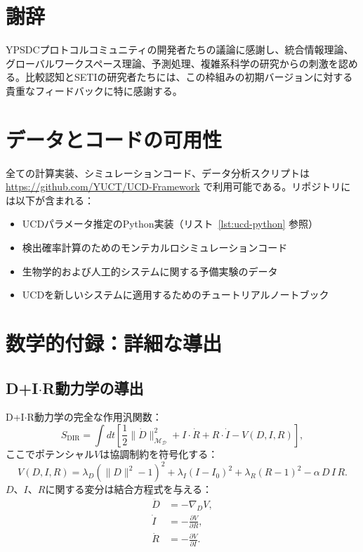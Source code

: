 \documentclass[11pt,a4paper]{article}
\newcommand{\Dict}{\mathcal{D}}
\newcommand{\Mdict}{\mathcal{M}_{\Dict}}
\begin{document}
	\section*{謝辞}
	
	YPSDCプロトコルコミュニティの開発者たちの議論に感謝し、統合情報理論、グローバルワークスペース理論、予測処理、複雑系科学の研究からの刺激を認める。比較認知とSETIの研究者たちには、この枠組みの初期バージョンに対する貴重なフィードバックに特に感謝する。
	
	\section*{データとコードの可用性}
	
	全ての計算実装、シミュレーションコード、データ分析スクリプトは \url{https://github.com/YUCT/UCD-Framework} で利用可能である。リポジトリには以下が含まれる：
	\begin{itemize}
		\item UCDパラメータ推定のPython実装（リスト~\ref{lst:ucd-python} 参照）
		\item 検出確率計算のためのモンテカルロシミュレーションコード
		\item 生物学的および人工的システムに関する予備実験のデータ
		\item UCDを新しいシステムに適用するためのチュートリアルノートブック
	\end{itemize}
	
	\appendix
	
	\section{数学的付録：詳細な導出}
	
	\subsection{D+I\(\cdot\)R動力学の導出}
	
	D+I\(\cdot\)R動力学の完全な作用汎関数：
	\[
	S_{\mathrm{DIR}} = \int dt \left[ \frac{1}{2}\|\dot{D}\|^2_{\Mdict} + I \cdot \dot{R} + R \cdot \dot{I} - V(D,I,R) \right],
	\]
	ここでポテンシャル\(V\)は協調制約を符号化する：
	\[
	V(D,I,R) = \lambda_D (\|D\|^2 - 1)^2 + \lambda_I (I - I_0)^2 + \lambda_R (R - 1)^2 - \alpha\, D\,I\,R.
	\]
	\(D\)、\(I\)、\(R\)に関する変分は結合方程式を与える：
	\begin{align*}
		\ddot{D} &= -\nabla_D V, \\
		\dot{I}  &= -\frac{\partial V}{\partial R}, \\
		\dot{R}  &= -\frac{\partial V}{\partial I}.
	\end{align*}
	
\end{document}
